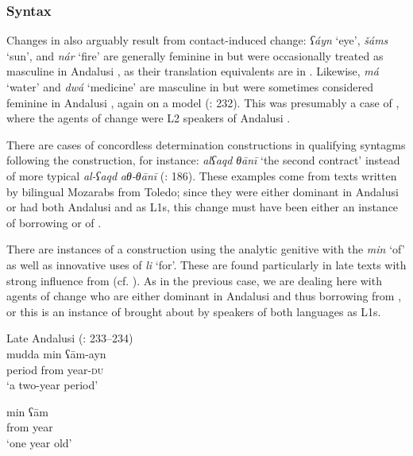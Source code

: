 \documentclass[output=paper,modfonts,nonflat]{langsci/langscibook}
\begin{document}
\subsubsection{Syntax}\largerpage

Changes in   also arguably result from contact-induced change: \textit{ʕáyn} ‘eye’, \textit{šáms} ‘sun’, and \textit{nár} ‘fire’ are generally feminine in  but were occasionally treated as masculine in Andalusi , as their translation equivalents are in . Likewise, \textit{má} ‘water’ and \textit{dwá} ‘medicine’ are masculine in  but were sometimes considered feminine in Andalusi , again on a  model (\citealt{CorrientePereiraVicente2015}: 232). This was presumably a case of , where the agents of change were L2 speakers of Andalusi . 

There are cases of concordless determination constructions in qualifying syntagms following the  construction, for instance: \textit{alʕaqd} \textit{θānī} ‘the second contract’ instead of more typical \textit{al-ʕaqd} \textit{aθ-θānī} (\citealt{CorrientePereiraVicente2015}: 186). These examples come from texts written by bilingual Mozarabs from Toledo; since they were either dominant in Andalusi  or had both Andalusi  and  as L1s, this change must have been either an instance of borrowing or of . 

There are instances of a construction using the analytic genitive with the  \textit{min} ‘of’ as well as innovative uses of \textit{li} ‘for’. These are found particularly in late texts with strong influence from  (cf. \citealt{Corriente2012}). As in the previous case, we are dealing here with agents of change who are either dominant in Andalusi  and thus borrowing from , or this is an instance of  brought about by speakers of both languages as L1s.


\ea\label{bkm:Ref13069050}
{Late} Andalusi  (\citealt{CorrientePereiraVicente2015}: 233–234)\\
\ea \gll mudda min ʕām-ayn\\
     period from year-\textsc{du}\\
\glt ‘a two-year period’



\ex
\gll min ʕām\\
     from year\\
\glt ‘one year old’
\end{document}
